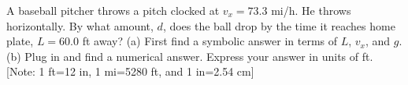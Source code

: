  A baseball pitcher throws a pitch clocked at $v_x=73.3$
mi/h. He throws horizontally. By what amount, $d$, does the
ball drop by the time it reaches home plate, $L=60$.0 ft
away?\hwendpart 
(a) First find a symbolic answer in terms of $L$,
$v_x$, and $g$.\hwendpart
 (b) Plug in and find a numerical answer.
Express your answer in units of ft. [Note: 1 ft=12 in, 1
mi=5280 ft, and 1 in=2.54 cm]\answercheck
